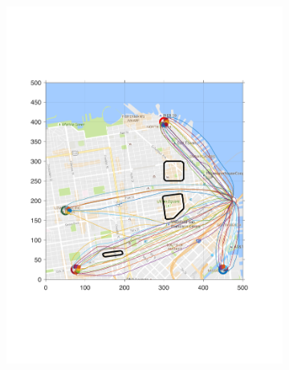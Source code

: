 \begin{figure}[!htb]
\begin{subfigure}{0.5\columnwidth}
  \includegraphics[width=\columnwidth]{figs/sf_d11sep0}
  \label{fig:sf_d11sep0}
\end{subfigure}%


\end{figure}
